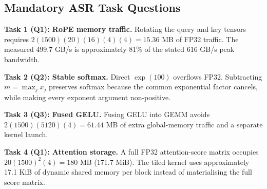 \subsection{Mandatory ASR Task Questions}

\noindent\textbf{Task 1 (Q1): RoPE memory traffic.}
Rotating the query and key tensors requires
$2(1500)(20)(16)(4)(4)=15.36$ MB of FP32 traffic.
The measured 499.7 GB/s is approximately 81\%
of the stated 616 GB/s peak bandwidth.

\noindent\textbf{Task 2 (Q2): Stable softmax.}
Direct $\exp(100)$ overflows FP32.
Subtracting $m=\max_j x_j$ preserves softmax
because the common exponential factor cancels,
while making every exponent argument non-positive.

\noindent\textbf{Task 3 (Q3): Fused GELU.}
Fusing GELU into GEMM avoids
$2(1500)(5120)(4)=61.44$ MB of extra
global-memory traffic and a separate kernel launch.

\noindent\textbf{Task 4 (Q1): Attention storage.}
A full FP32 attention-score matrix occupies
$20(1500)^2(4)=180$ MB (171.7 MiB).
The tiled kernel uses approximately 17.1 KiB
of dynamic shared memory per block instead of
materialising the full score matrix.
